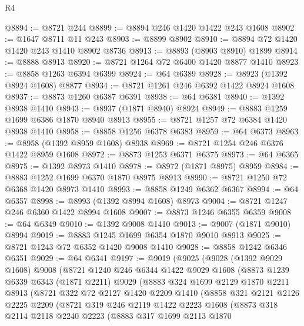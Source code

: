 \begin{lexlean}{R4}
\begin{coremodule}
@8894 := @8721 @244
@8899 := @8894 @246 @1420 @1422 @243 @1608
@8902 := @1647 @8711 @11 @243
@8903 := @8899 @8902
@8910 := @8894 @72 @1420 @1420 @243 @1410 @8902 @8736
@8913 := @8893 (@8903 @8910) @1899
@8914 := @8888 @8913
@8920 := @8721 @1264 @72 @6400 @1420 @8877 @1410
@8923 := @8858 @1263 @6394 @6399
@8924 := @64 @6389
@8928 := @8923 (@1392 @8924 @1608) @8877
@8934 := @8721 @1261 @246 @6392 @1422 @8924 @1608
@8937 := @8873 @1260 @6387 @6391
@8938 := @64 @6381
@8940 := @1392 @8938 @1410
@8943 := @8937 (@1871 @8940) @8924
@8949 := @8883 @1259 @1699 @6386 @1870 @8940 @8913
@8955 := @8721 @1257 @72 @6384 @1420 @8938 @1410
@8958 := @8858 @1256 @6378 @6383
@8959 := @64 @6373
@8963 := @8958 (@1392 @8959 @1608) @8938
@8969 := @8721 @1254 @246 @6376 @1422 @8959 @1608
@8972 := @8873 @1253 @6371 @6375
@8973 := @64 @6365
@8975 := @1392 @8973 @1410
@8978 := @8972 (@1871 @8975) @8959
@8984 := @8883 @1252 @1699 @6370 @1870 @8975 @8913
@8990 := @8721 @1250 @72 @6368 @1420 @8973 @1410
@8993 := @8858 @1249 @6362 @6367
@8994 := @64 @6357
@8998 := @8993 (@1392 @8994 @1608) @8973
@9004 := @8721 @1247 @246 @6360 @1422 @8994 @1608
@9007 := @8873 @1246 @6355 @6359
@9008 := @64 @6349
@9010 := @1392 @9008 @1410
@9013 := @9007 (@1871 @9010) @8994
@9019 := @8883 @1245 @1699 @6354 @1870 @9010 @8913
@9025 := @8721 @1243 @72 @6352 @1420 @9008 @1410
@9028 := @8858 @1242 @6346 @6351
@9029 := @64 @6341
@9197 := @9019
    (@9025
      (@9028
        (@1392 @9029 @1608)
        @9008
        (@8721
          @1240
          @246
          @6344
          @1422
          @9029
          @1608
          (@8873
            @1239
            @6339
            @6343
            (@1871 @2211)
            @9029
            (@8883
              @324
              @1699
              @2129
              @1870
              @2211
              @8913
              (@8721
                @322
                @72
                @2127
                @1420
                @2209
                @1410
                (@8858
                  @321
                  @2121
                  @2126
                  @2225
                  @2209
                  (@8721
                    @319
                    @246
                    @2119
                    @1422
                    @2223
                    @1608
                    (@8873
                      @318
                      @2114
                      @2118
                      @2240
                      @2223
                      (@8883
                        @317
                        @1699
                        @2113
                        @1870

\end{coremodule}
\end{lexlean}
